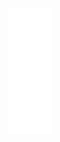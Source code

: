 \documentclass[10pt]{article}
\begin{document}
\includegraphics[max width=\textwidth, center]{2025_04_17_46e04c6acd873ea9558dg-142(8)}
\end{document}
